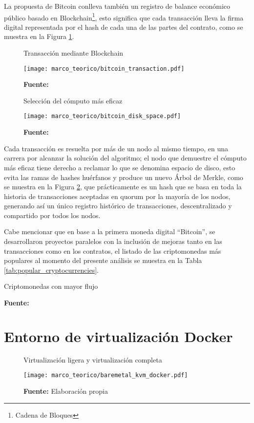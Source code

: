\documentclass[../main/main.tex]{subfiles}
\begin{document}
  La propuesta de Bitcoin conlleva también un registro de balance económico público basado en Blockchain\footnote{Cadena de Bloques}, esto significa que cada transacción lleva la firma digital representada por el hash de cada una de las partes del contrato, como se muestra en la Figura \ref{fig:bitcoin_transaction}.

  \begin{figure}[H]
    \centering
    \caption{Transacción mediante Blockchain}
    \texttt{[image: marco\_teorico/bitcoin\_transaction.pdf]}
    \caption*{\textbf{Fuente:} \cite[p.~2]{article:satoshi_bitcoin}}
    \label{fig:bitcoin_transaction}
  \end{figure}

  \begin{figure}[H]
    \centering
    \caption{Selección del cómputo más eficaz}
    \texttt{[image: marco\_teorico/bitcoin\_disk\_space.pdf]}
    \caption*{\textbf{Fuente:} \cite[p.~4]{article:satoshi_bitcoin}}
    \label{fig:bitcoin_disk_space}
  \end{figure}

  Cada transacción es resuelta por más de un nodo al mismo tiempo, en una carrera por alcanzar la solución del algoritmo; el nodo que demuestre el cómputo más eficaz tiene derecho a reclamar lo que se denomina espacio de disco, esto evita las ramas de hashes huérfanos y produce un nuevo Árbol de Merkle, como se muestra en la Figura \ref{fig:bitcoin_disk_space}, que prácticamente es un hash que se basa en toda la historia de transacciones aceptadas en quorum por la mayoría de los nodos, generando así un único registro histórico de transacciones, descentralizado y compartido por todos los nodos.

  Cabe mencionar que en base a la primera moneda digital ``Bitcoin'', se desarrollaron proyectos paralelos con la inclusión de mejoras tanto en las transacciones como en los contratos, el listado de las criptomonedas más populares al momento del presente análisis se muestra en la Tabla \ref{tab:popular_cryptocurrencies}.

  \begin{table}[H]
    \centering
    \caption{Criptomonedas con mayor flujo}
    
    \caption*{\textbf{Fuente:} \cite{web:coinmarketcap}}
    \label{tab:popular_cryptocurrencies}
  \end{table}

  \section{Entorno de virtualización Docker}

  \begin{figure}[H]
    \centering
    \caption{Virtualización ligera y virtualización completa}
    \texttt{[image: marco\_teorico/baremetal\_kvm\_docker.pdf]}
    \caption*{\textbf{Fuente:} Elaboración propia}
  \end{figure}
\end{document}
